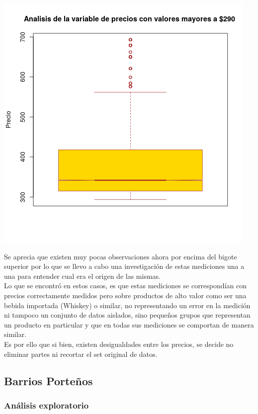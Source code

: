 \begin{center}
    \includegraphics[scale=0.6]{img/boxplot_mayor290.png}
\end{center}

Se aprecia que existen muy pocas observaciones ahora por encima del bigote superior por lo que se llevo a cabo una investigación de estas mediciones una a una para entender cual era el origen de las mismas.\\
Lo que se encontró en estos casos, es que estas mediciones se correspondían con precios correctamente medidos pero sobre productos de alto valor como ser una bebida importada (Whiskey) o similar, no representando un error en la medición ni tampoco un conjunto de datos aislados, sino pequeños grupos que representan un producto en particular y que en todas sus mediciones se comportan de manera similar.\\
Es por ello que si bien, existen desigualdades entre los precios, se decide no eliminar partes ni recortar el set original de datos.







\subsection{Barrios Porteños}
\subsubsection{Análisis exploratorio}

